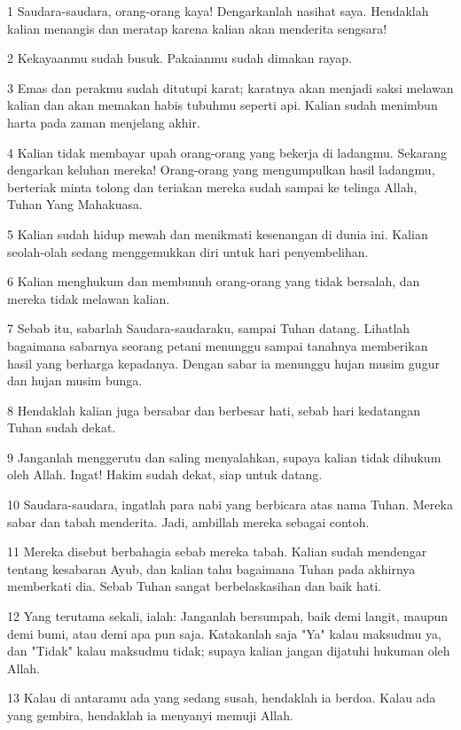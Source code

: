 \par 1 Saudara-saudara, orang-orang kaya! Dengarkanlah nasihat saya. Hendaklah kalian menangis dan meratap karena kalian akan menderita sengsara!
\par 2 Kekayaanmu sudah busuk. Pakaianmu sudah dimakan rayap.
\par 3 Emas dan perakmu sudah ditutupi karat; karatnya akan menjadi saksi melawan kalian dan akan memakan habis tubuhmu seperti api. Kalian sudah menimbun harta pada zaman menjelang akhir.
\par 4 Kalian tidak membayar upah orang-orang yang bekerja di ladangmu. Sekarang dengarkan keluhan mereka! Orang-orang yang mengumpulkan hasil ladangmu, berteriak minta tolong dan teriakan mereka sudah sampai ke telinga Allah, Tuhan Yang Mahakuasa.
\par 5 Kalian sudah hidup mewah dan menikmati kesenangan di dunia ini. Kalian seolah-olah sedang menggemukkan diri untuk hari penyembelihan.
\par 6 Kalian menghukum dan membunuh orang-orang yang tidak bersalah, dan mereka tidak melawan kalian.
\par 7 Sebab itu, sabarlah Saudara-saudaraku, sampai Tuhan datang. Lihatlah bagaimana sabarnya seorang petani menunggu sampai tanahnya memberikan hasil yang berharga kepadanya. Dengan sabar ia menunggu hujan musim gugur dan hujan musim bunga.
\par 8 Hendaklah kalian juga bersabar dan berbesar hati, sebab hari kedatangan Tuhan sudah dekat.
\par 9 Janganlah menggerutu dan saling menyalahkan, supaya kalian tidak dihukum oleh Allah. Ingat! Hakim sudah dekat, siap untuk datang.
\par 10 Saudara-saudara, ingatlah para nabi yang berbicara atas nama Tuhan. Mereka sabar dan tabah menderita. Jadi, ambillah mereka sebagai contoh.
\par 11 Mereka disebut berbahagia sebab mereka tabah. Kalian sudah mendengar tentang kesabaran Ayub, dan kalian tahu bagaimana Tuhan pada akhirnya memberkati dia. Sebab Tuhan sangat berbelaskasihan dan baik hati.
\par 12 Yang terutama sekali, ialah: Janganlah bersumpah, baik demi langit, maupun demi bumi, atau demi apa pun saja. Katakanlah saja "Ya" kalau maksudmu ya, dan "Tidak" kalau maksudmu tidak; supaya kalian jangan dijatuhi hukuman oleh Allah.
\par 13 Kalau di antaramu ada yang sedang susah, hendaklah ia berdoa. Kalau ada yang gembira, hendaklah ia menyanyi memuji Allah.
